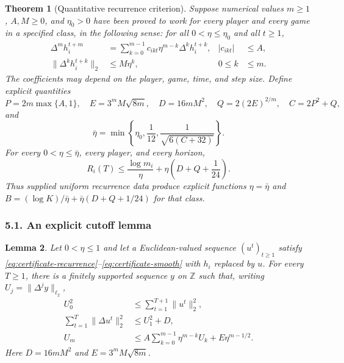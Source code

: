 \documentclass[11pt]{article}
\newtheorem{theorem}{Theorem}
\newtheorem{lemma}[theorem]{Lemma}
\newcommand{\norm}[1]{\lVert #1\rVert}
\begin{document}
\begin{theorem}[Quantitative recurrence criterion]\label{thm:certificate}
Suppose numerical values $m\geq1$, $A,M\geq0$, and $\eta_0>0$ have been
proved to work for every player and every game in a specified class, in the
following sense: for all $0<\eta\leq\eta_0$ and all $t\geq1$,
\begin{align}
 \Delta^m h_i^{t+m}
 &=\sum_{k=0}^{m-1}c_{ikt}\eta^{m-k}\Delta^k h_i^{t+k},
 & |c_{ikt}|&\leq A,\label{eq:certificate-recurrence}\\
 \norm{\Delta^k h_i^{t+k}}_2&\leq M\eta^k,
 &0\leq k&\leq m.\label{eq:certificate-smooth}
\end{align}
The coefficients may depend on the player, game, time, and step size.
Define explicit quantities
\[
 P=2m\max\{A,1\},\quad
 E=3^mM\sqrt{8m},\quad
 D=16mM^2,\quad
 Q=2(2E)^{2/m},\quad C=2P^2+Q,
\]
and
\[
 \bar\eta=\min\!\left\{\eta_0,\frac1{12},
          \frac1{\sqrt{6(C+32)}}\right\}.
\]
For every $0<\eta\leq\bar\eta$, every player, and every horizon,
\begin{equation}\label{eq:certificate-bound}
 R_i(T)\leq\frac{\log m_i}{\eta}
             +\eta\left(D+Q+\frac1{24}\right).
\end{equation}
Thus supplied uniform recurrence data produce explicit functions
$\eta=\bar\eta$ and
$B=(\log K)/\bar\eta+\bar\eta(D+Q+1/24)$ for that class.
\end{theorem}

\subsubsection*{5.1. An explicit cutoff lemma}

\begin{lemma}\label{lem:cutoff}
Let $0<\eta\leq1$ and let a Euclidean-valued sequence $(u^t)_{t\geq1}$
satisfy \eqref{eq:certificate-recurrence}--\eqref{eq:certificate-smooth}
with $h_i$ replaced by $u$. For every $T\geq1$, there is a finitely
supported sequence $y$ on $\mathbb Z$ such that, writing
$U_j=\norm{\Delta^j y}_{\ell_2}$,
\begin{align}
 U_0^2&\leq\sum_{t=1}^{T+1}\norm{u^t}_2^2,\label{eq:cutoff-zero}\\
 \sum_{t=1}^T\norm{\Delta u^t}_2^2&\leq U_1^2+D,\label{eq:cutoff-one}\\
 U_m&\leq A\sum_{k=0}^{m-1}\eta^{m-k}U_k
              +E\eta^{m-1/2}.\label{eq:cutoff-high}
\end{align}
Here $D=16mM^2$ and $E=3^mM\sqrt{8m}$.
\end{lemma}
\end{document}
